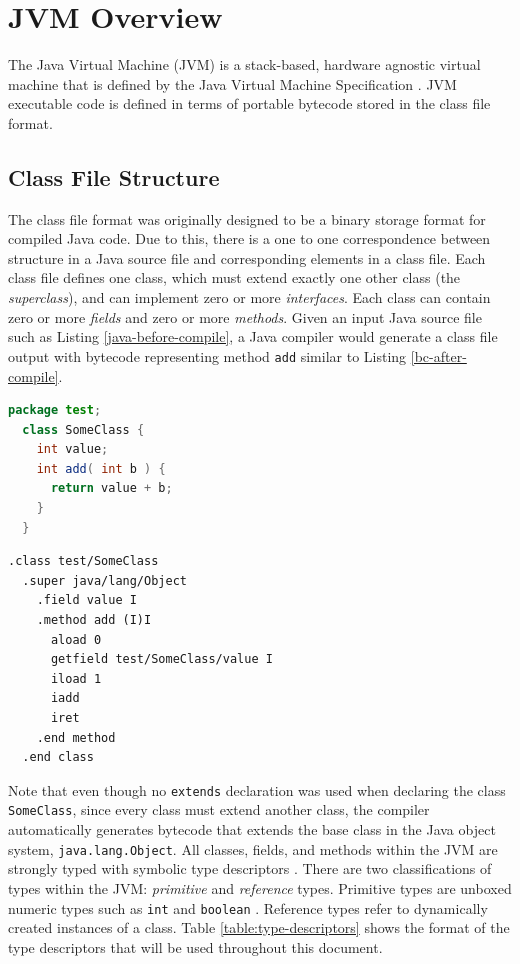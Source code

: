 \chapter{JVM Overview}
\label{chapter:JVM}
\lhead{ \leftmark }

The Java Virtual Machine (JVM) is a stack-based, hardware agnostic virtual machine that is defined by the Java Virtual Machine Specification \cite{jvms7}.  JVM executable code is defined in terms of portable bytecode \cite[4.10]{jvms7} stored in the class file format.

\section{Class File Structure}

The class file format was originally designed to be a binary storage format for compiled Java code.  Due to this, there is a one to one correspondence between structure in a Java source file and corresponding elements in a class file.  Each class file defines one class, which must extend exactly one other class (the \emph{superclass}), and can implement zero or more \emph{interfaces}.  Each class can contain zero or more \emph{fields} and zero or more \emph{methods}.  Given an input Java source file such as Listing \ref{java-before-compile}, a Java compiler would generate a class file output with bytecode representing method \texttt{add} similar to Listing \ref{bc-after-compile}.

\smallskip

\begin{lstlisting}[language=Java,caption=Java before compilation,label=java-before-compile]
  package test;
  class SomeClass {
    int value;
    int add( int b ) {
      return value + b;
    }
  }
\end{lstlisting}

\smallskip

\begin{lstlisting}[language=jvm-bytecode,caption=Mnemonic pseudocode describing the binary structure of class files,label=bc-after-compile]
  .class test/SomeClass
  .super java/lang/Object
    .field value I
    .method add (I)I 
      aload 0
      getfield test/SomeClass/value I
      iload 1
      iadd
      iret
    .end method
  .end class
\end{lstlisting}

Note that even though no \texttt{extends} declaration was used when declaring the class \texttt{SomeClass}, since every class must extend another class, the compiler automatically generates bytecode that extends the base class in the Java object system, \texttt{java.lang.Object}.  All classes, fields, and methods within the JVM are strongly typed with symbolic type descriptors \cite[4.3]{jvms7}.  There are two classifications of types within the JVM: \emph{primitive} and \emph{reference} types.  Primitive types are unboxed numeric types such as \texttt{int} and \texttt{boolean} \cite[2.3]{jvms7}.  Reference types refer to dynamically created instances of a class.  Table \ref{table:type-descriptors} shows the format of the type descriptors that will be used throughout this document.

